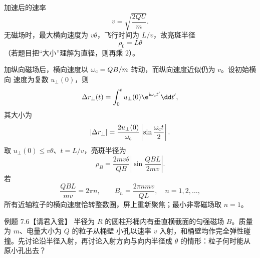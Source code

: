 \begin{xesolution}
加速后的速率
\[
  v=\sqrt{\frac{2QU}{m}}.
\]
无磁场时，最大横向速度为 $v\theta$，飞行时间为 $L/v$，故亮斑半径
\begin{equation}
  \boxed{\rho_0=L\theta}
\end{equation}
（若题目把“大小”理解为直径，则再乘 $2$）。

加纵向磁场后，横向速度以 $\omega_{\rm c}=QB/m$ 转动，而纵向速度近似仍为 $v$。设初始横向
速度为复数 $u_\perp(0)$，则
\[
  \Delta r_\perp(t)=\int_0^t u_\perp(0)\e^{\mathrm i\omega_{\rm c}t'}\dd t',
\]
其大小为
\[
  |\Delta r_\perp|=\frac{2u_\perp(0)}{\omega_{\rm c}}
  \left|\sin\frac{\omega_{\rm c}t}{2}\right|.
\]
取 $u_\perp(0)\le v\theta$、$t=L/v$，亮斑半径为
\begin{equation}
  \boxed{\rho_B=\frac{2mv\theta}{QB}
  \left|\sin\frac{QBL}{2mv}\right|}.
\end{equation}
若
\begin{equation}
  \frac{QBL}{mv}=2\pi n,
  \qquad
  \boxed{B_n=\frac{2\pi n m v}{QL}},\quad n=1,2,\ldots,
\end{equation}
所有近轴粒子的横向速度恰转整数圈，屏上重新聚焦；最小非零磁场取 $n=1$。

\beamFocusDiagram
\end{xesolution}

\Needspace{0.44\textheight}
\begin{origexamplebox}{例题 7.6【请君入瓮】}
半径为 $R$ 的圆柱形桶内有垂直横截面的匀强磁场 $B$。质量为 $m$、电量大小为 $Q$ 的粒子从桶壁
小孔以速率 $v$ 入射，和桶壁均作完全弹性碰撞。先讨论沿半径入射，再讨论入射方向与向内半径成
$\theta$ 的情形：粒子何时能从原小孔出去？

\begin{center}
\end{center}
\label{fig:em22-question-6}
\end{origexamplebox}

